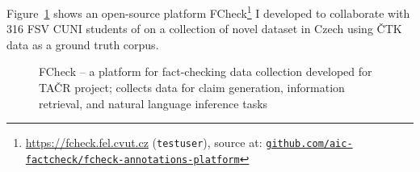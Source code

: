 Figure~\ref{fig:fcheck} shows an open-source platform FCheck\footnote{\url{https://fcheck.fel.cvut.cz} (\texttt{testuser}), source at: \href{https://github.com/aic-factcheck/fcheck-annotations-platform}{\texttt{github.com/aic-factcheck/fcheck-annotations-platform}}} I developed to collaborate with 316 FSV CUNI students of on a collection of novel dataset in Czech using ČTK data as a ground truth corpus.
\label{sec:datasets}
\begin{figure}[H]
    \caption{{\techbf FCheck} -- a platform for fact-checking data collection developed for TAČR project; collects data for claim generation, information retrieval, and natural language inference tasks}
    \label{fig:fcheck}
\end{figure}

